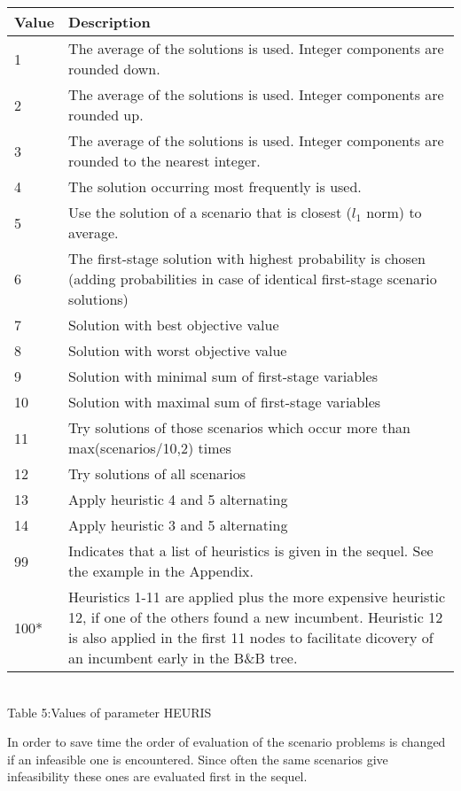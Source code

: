 \documentclass[11pt,draft]{article}
\newcommand{\+}{{\ti{+}}}
\newcommand{\1}{{\ti{1}}}
\begin{document}
\begin{center}
\begin{tabular}{|lp{11.2cm}|} 
\hline
Value&Description\\ \hline
1&The average of the solutions is used. Integer components are rounded down.\medskip\\
2&The average of the solutions is used. Integer components are rounded up.\medskip\\
3&The average of the solutions is used. Integer components are rounded to the
nearest integer.\medskip\\
4&The solution occurring most frequently is used.\medskip\\
5&Use the solution of a scenario that is closest ($l_1$ norm) to average.\medskip\\
6&The first-stage solution with highest probability is chosen (adding probabilities in case of identical first-stage scenario solutions)\medskip\\
7&Solution with best objective value\medskip\\
8&Solution with worst objective value\medskip\\
9&Solution with minimal sum of first-stage variables\medskip\\
10&Solution with maximal sum of first-stage variables\medskip\\
11&Try solutions of those scenarios which occur more than max(scenarios/10,2) times\medskip\\
12&Try solutions of all scenarios\medskip\\
13&Apply heuristic 4 and 5 alternating\medskip\\
14&Apply heuristic 3 and 5 alternating\medskip\\
99&Indicates that a list of heuristics is given in the sequel. See the example in the Appendix.\\
100*&Heuristics 1-11 are applied plus the more expensive heuristic 12, if one of the others found a new incumbent. Heuristic 12 is also applied in the first 11 nodes to facilitate dicovery of an incumbent early in the B\&B tree.\\
\hline
\end{tabular}
\\[0.5em]Table 5:\quad Values of parameter HEURIS\\
\end{center} %
%
\setcounter{table}{4}
%
In order to save time the order of evaluation of the scenario problems is changed if an infeasible one is encountered.
Since often the same scenarios give infeasibility these ones are evaluated first in the sequel.
\end{document}
